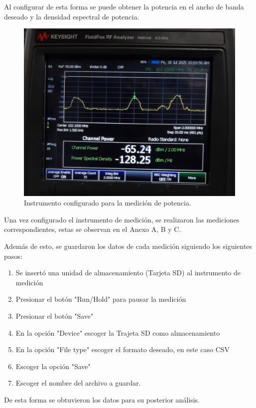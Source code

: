 \documentclass[conference]{IEEEtran}
\begin{document}
\begin{enumerate}
		
	\end{enumerate}
	
	Al configurar de esta forma se puede obtener la potencia en el ancho de banda deseado y la densidad espectral de potencia.
	
	\begin{figure}[h]
		\centering
		\includegraphics[width=0.8\linewidth]{media/InsConf.jpg}
		\caption{Instrumento configurado para la medición de potencia.}
		\label{fig:InsConf}
	\end{figure}
	
	Una vez configurado el instrumento de medición, se realizaron las mediciones correspondientes, estas se observan en el Anexo A, B y C.
	
	Además de esto, se guardaron los datos de cada medición siguiendo los siguientes pasos:
	
	\begin{enumerate}
		\item Se insertó una unidad de almacenamiento (Tarjeta SD) al instrumento de medición
		\item Presionar el botón "Run/Hold" para pausar la medición
		\item Presionar el botón "Save"
		\item En la opción "Device" escoger la Trajeta SD como almacenamiento
		\item En la opción "File type" escoger el formato deseado, en este caso CSV
		\item Escoger la opción "Save"
		\item Escoger el nombre del archivo a guardar.
	\end{enumerate}
	
	De esta forma se obtuvieron los datos para su posterior análisis.
	
\end{document}
